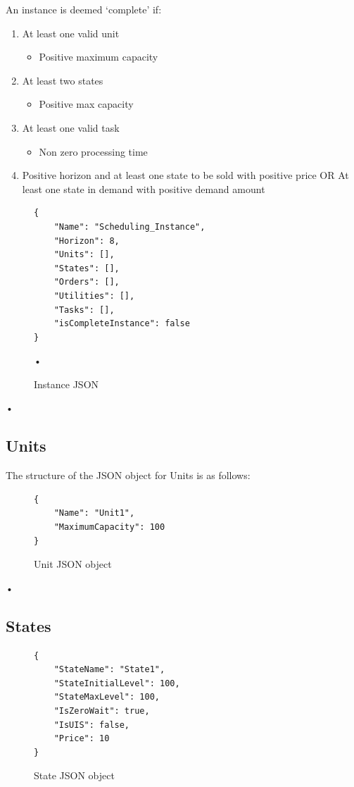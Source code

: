 An instance is deemed `complete' if:
\begin{enumerate}
\item At least one valid unit
\begin{itemize}
\item Positive maximum capacity
\end{itemize}
\item At least two states
\begin{itemize}
\item Positive max capacity
\end{itemize}
\item At least one valid task
\begin{itemize}
\item Non zero processing time
\end{itemize}
\item Positive horizon and at least one state to be sold with positive price OR At least one state in demand with positive demand amount
\end{enumerate}

\begin{figure}
\begin{center}
\begin{lstlisting}
{
	"Name": "Scheduling_Instance",
	"Horizon": 8,
	"Units": [],
	"States": [],
	"Orders": [],
	"Utilities": [],
	"Tasks": [],
	"isCompleteInstance": false
}
\end{lstlisting}\end{center}•
\caption{Instance JSON}
\label{code:Instance}
\end{figure}•



\subsection{Units}
The structure of the JSON object for Units is as follows:
\begin{figure}
\begin{lstlisting}
{
	"Name": "Unit1",
	"MaximumCapacity": 100
}
\end{lstlisting}
\caption{Unit JSON object}
\end{figure}•
\subsection{States}
\begin{figure}
\begin{lstlisting}
{
	"StateName": "State1",
	"StateInitialLevel": 100,
	"StateMaxLevel": 100,
	"IsZeroWait": true,
	"IsUIS": false,
	"Price": 10
}
\end{lstlisting}
\caption{State JSON object}
\end{figure}

